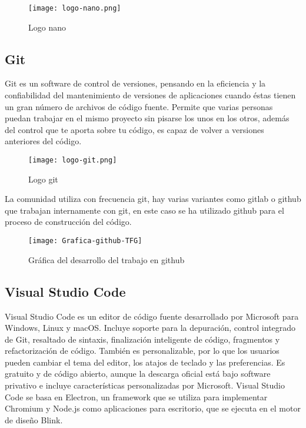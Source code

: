 \documentclass[ spanish, a4paper, 12pt, oneside]{report}
\begin{document}
\begin{figure}[!h]
   \centering
   \texttt{[image: logo-nano.png]}\\
      \caption{\label{fig: Logo nano} Logo nano}
\end{figure}

\subsection{Git}
Git es un software de control de versiones, pensando en la eficiencia y la confiabilidad del mantenimiento de versiones de aplicaciones cuando éstas tienen un gran número de archivos de código fuente. Permite que varias personas puedan trabajar en el mismo proyecto sin pisarse los unos en los otros, 
además del control que te aporta sobre tu código, es capaz de volver a versiones anteriores del código. \\

\begin{figure}[!h]
   \centering
   \texttt{[image: logo-git.png]}\\
      \caption{\label{fig: Logo git} Logo git}
\end{figure}

La comunidad utiliza con frecuencia git, hay varias variantes como gitlab o github que trabajan internamente con git, en este caso se ha utilizado github para el proceso de construcción del código.\\

\begin{figure}[!h]
   \centering
   \texttt{[image: Grafica-github-TFG]}\\
      \caption{\label{fig: Gráfica github} Gráfica del desarrollo del trabajo en github}
\end{figure}

\subsection{Visual Studio Code}
Visual Studio Code es un editor de código fuente desarrollado por Microsoft para Windows, Linux y macOS. Incluye soporte para la depuración, control integrado de Git, resaltado de sintaxis, finalización inteligente de código, fragmentos y refactorización de código. También es personalizable, 
por lo que los usuarios pueden cambiar el tema del editor, los atajos de teclado y las preferencias. Es gratuito y de código abierto, aunque la descarga oficial está bajo software privativo e incluye características personalizadas por Microsoft. Visual Studio Code se basa en 
Electron, un framework que se utiliza para implementar Chromium y Node.js como aplicaciones para escritorio, que se ejecuta en el motor de diseño Blink. \\
\end{document}
